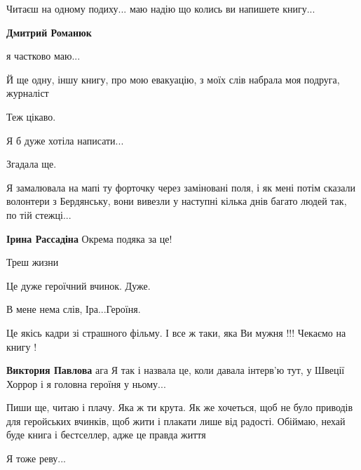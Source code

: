 
Читаєш на одному подиху... маю надію що колись ви напишете книгу...

\begin{itemize} %
\textbf{Дмитрий Романюк} 

я частково маю...

Й ще одну, іншу книгу, про мою евакуацію, з моїх слів набрала моя подруга, журналіст

Теж цікаво.

Я б дуже хотіла написати...
\end{itemize} %


Згадала ще.

Я замалювала на мапі ту форточку через заміновані поля, і як мені потім сказали
волонтери з Бердянську, вони вивезли у наступні кілька днів багато людей так,
по тій стежці...

\begin{itemize} %
\textbf{Ірина Рассадіна} Окрема подяка за це!
\end{itemize} %


Треш жизни


Це дуже героїчний вчинок. Дуже.


В мене нема слів, Іра...Героїня.


Це якісь кадри зі страшного фільму. І все ж таки, яка Ви мужня !!! Чекаємо на книгу !

\begin{itemize} %
\textbf{Виктория Павлова} ага
Я так і назвала це, коли давала інтерв'ю тут, у Швеції
Хоррор і я головна героїня у ньому...
\end{itemize} %


Пиши ще, читаю і плачу. Яка ж ти крута. Як же хочеться, щоб не було приводів
для геройських вчинків, щоб жити і плакати лише від радості. Обіймаю, нехай
буде книга і бестселлер, адже це правда життя 🙏


Я тоже реву...


